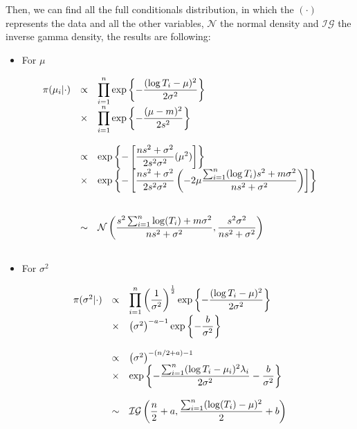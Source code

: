 \documentclass{asaproc}
\begin{document}
Then, we can find all the full conditionals distribution, in which the $(\cdot)$ represents the data and all the other variables, $\mathcal{N}$ the normal density and $\mathcal{IG}$ the inverse gamma density, the results are following:

\begin{itemize}
\item For $\mu$
\end{itemize}
\begin{small}
\begin{eqnarray*}
\begin{array}{lcl ll }
\pi(\mu_i|\cdot) & \propto &\displaystyle\prod_{i=1}^{n} \mbox{exp}\left\{ -\dfrac{ (\log T_i - \mu)^2}{2\sigma^2} \right\} \\
& \times & \displaystyle\prod_{i=1}^{n} \mbox{exp}\left\{ -\dfrac{(\mu - m)^2}{2 s^2}\right\}  \\ \\
& \propto & \mbox{exp}\left\{ - \left[ \dfrac{n s^2 + \sigma^2}{2 s^2\sigma^2}(\mu^2) \right] \right\} \\
& \times & \mbox{exp}\left\{ - \left[ \dfrac{n s^2 + \sigma^2}{2 s^2\sigma^2}\left( -2\mu \dfrac{\sum_{i=1}^{n}(\log T_i) s^2 + m\sigma^2}{n s^2 + \sigma^2} \right) \right] \right\} \\ \\ \\
& \sim &\mathcal{N}\left( \dfrac{s^2\sum_{i=1}^{n} \log(T_i) + m\sigma^2}{n s^2 + \sigma^2}, \dfrac{s^2\sigma^2}{n s^2 + \sigma^2} \right) \\ \\

\end{array}
\end{eqnarray*}
\end{small}

\begin{itemize}
\item For $\sigma^2$
\end{itemize}
\begin{small}
\begin{eqnarray*}
\begin{array}{lcl ll }
\pi(\sigma^2|\cdot) & \propto &\displaystyle\prod_{i=1}^{n}  \left(\dfrac{1}{\sigma^2}\right)^{\frac{1}{2}}\mbox{exp}\left\{ -\dfrac{(\log T_i - \mu)^2}{2\sigma^2} \right\} \\
& \times & \left(\sigma^2\right)^{-a-1} \mbox{exp}\left\{ -\dfrac{b}{\sigma^2}\right\}  \\ \\
 & \propto & \left(\sigma^2\right)^{-(n/2 + a)-1} \\
& \times & \mbox{exp}\left\{ -\dfrac{ \sum_{i=1}^{n}(\log T_i - \mu_i)^2\lambda_i}{2\sigma^2} -\dfrac{b}{\sigma^2}\right\}  \\ \\
& \sim & \mathcal{IG}\left( \dfrac{n}{2}+a,  \dfrac{\sum_{i=1}^{n} (\log(T_i) - \mu)^2}{2} + b \right)
\end{array}
\end{eqnarray*}
\end{small}
\end{document}
